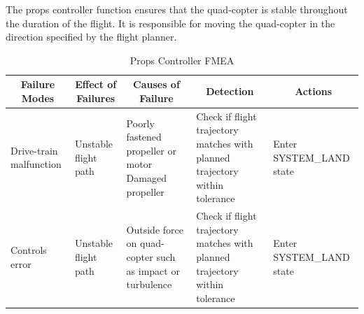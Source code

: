 \documentclass[10pt,letterpaper]{article}
\newcommand{\fmeaheader}{\multicolumn{1}{c}{\textbf{Failure Modes}} & \multicolumn{1}{c}{\textbf{Effect of Failures}} & \multicolumn{1}{c}{\textbf{Causes of Failure}} & \multicolumn{1}{c}{\textbf{Detection}} & \multicolumn{1}{c}{\textbf{Actions}}}
\begin{document}
The props controller function ensures that the quad-copter is stable throughout the duration of the flight. It is responsible for moving the quad-copter in the direction specified by the flight planner.
\begin{table}[H]
\footnotesize  
	\begin{adjustwidth}{-1.8in}{-1.8in}  
      \begin{center}
          \begin{tabular}{|p{3cm}p{3cm}p{3cm}p{3cm}p{4.5cm}|}
              \fmeaheader \\ \hline
              
              Drive-train malfunction & 
              Unstable flight path &
              \parbox[t]{3cm}{Poorly fastened propeller or motor \\ Damaged propeller} &
              Check if flight trajectory matches with planned trajectory within tolerance &
              Enter SYSTEM\_LAND state
          	  \\ \hline
              
              Controls error & 
              Unstable flight path &
              \parbox[t]{3cm}{Outside force on quad-copter such as impact or turbulence} &
              Check if flight trajectory matches with planned trajectory within tolerance &
              Enter SYSTEM\_LAND state
          	  \\ \hline
          \end{tabular}
      \end{center}
      \caption[Props Controller FMEA]{Props Controller FMEA}
    \end{adjustwidth}
\end{table}

\newpage 
\end{document}
